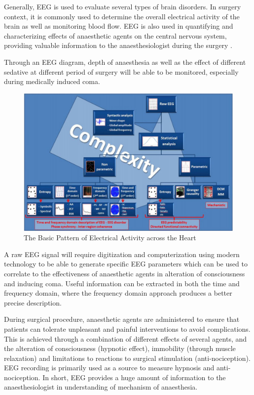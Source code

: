 Generally, EEG is used to evaluate several types of brain disorders. In surgery context, it is commonly used to determine the overall electrical activity of the brain as well as monitoring blood flow. EEG is also used in quantifying and characterizing effects of anaesthetic agents on the central nervous system, providing valuable information to the anaesthesiologist during the surgery \cite{jiahui2}. 

Through an EEG diagram, depth of anaesthesia as well as the effect of different sedative at different period of surgery will be able to be monitored, especially during medically induced coma.  

\begin{figure}[H]
	\centering
	\includegraphics[width=\linewidth]{jiahuipic1.jpg}
	\caption{The Basic Pattern of Electrical Activity across the Heart \cite{jiahui2}}
\end{figure}

A raw EEG signal will require digitization and computerization using modern technology to be able to generate specific EEG parameters which can be used to correlate to the effectiveness of anaesthetic agents in alteration of consciousness and inducing coma. Useful information can be extracted in both the time and frequency domain, where the frequency domain approach produces a better precise description. 

During surgical procedure, anaesthetic agents are administered to ensure that patients can tolerate unpleasant and painful interventions to avoid complications. This is achieved through a combination of different effects of several agents, and the alteration of consciousness (hypnotic effect), immobility (through muscle relaxation) and limitations to reactions to surgical stimulation (anti-nociception). EEG recording is primarily used as a source to measure hypnosis and anti-nociception. In short, EEG provides a huge amount of information to the anaesthesiologist in understanding of mechanism of anaesthesia. 

